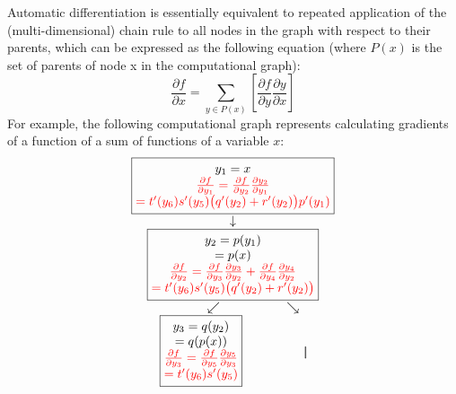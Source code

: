 Automatic differentiation is essentially equivalent to repeated application of the (multi-dimensional) chain rule to all nodes in the graph with respect to their parents, which can be expressed as the following equation (where $P(x)$ is the set of parents of node x in the computational graph):
\begin{equation}
    \frac{\partial f}{\partial x} = \sum_{y\in P(x)}{\left[ \frac{\partial f}{\partial y}\frac{\partial y}{\partial x}\right]}
\end{equation}
For example, the following computational graph represents calculating gradients of a function of a sum of functions of a variable $x$:
\begin{equation*}
    \begin{matrix}
        \boxed{\begin{matrix}
            y_1=x \\
            \color{red}{\frac{\partial f}{\partial y_1} = \frac{\partial f}{\partial y_2}\frac{\partial y_2}{\partial y_1}} \\
            \color{red}{= t'(y_6)s'(y_5)\bigl( q'(y_2) + r'(y_2) \bigr)p'(y_1)}
        \end{matrix}} \\
        \downarrow \\
        \boxed{\begin{matrix}
            y_2=p(y_1) \\
            =p(x) \\
            \color{red}{\frac{\partial f}{\partial y_2} = \frac{\partial f}{\partial y_3}\frac{\partial y_3}{\partial y_2} + \frac{\partial f}{\partial y_4}\frac{\partial y_4}{\partial y_2}} \\
            \color{red}{= t'(y_6)s'(y_5)\bigl( q'(y_2) + r'(y_2) \bigr)}
        \end{matrix}} \\
        \begin{matrix}
            \swarrow & \searrow \\
            \boxed{\begin{matrix}
                y_3=q(y_2) \\
                =q(p(x)) \\
                \color{red}{\frac{\partial f}{\partial y_3} = \frac{\partial f}{\partial y_5}\frac{\partial y_5}{\partial y_3}} \\
                \color{red}{= t'(y_6)s'(y_5)}
            \end{matrix}} \qquad & \qquad
            \boxed{\begin{matrix}

\end{matrix}}
\end{matrix}
\end{matrix}
\end{equation*}
